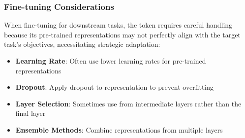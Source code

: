 \subsubsection{Fine-tuning Considerations}
When fine-tuning for downstream tasks, the \cls{} token requires careful handling because its pre-trained representations may not perfectly align with the target task's objectives, necessitating strategic adaptation:
\begin{comment}
Feedback: One more sentence to elaborate why we need some extra care for downstream tasks.

STATUS: addressed - added explanation about why CLS tokens need careful handling during fine-tuning
\end{comment}

\begin{itemize}
\item \textbf{Learning Rate}: Often use lower learning rates for pre-trained \cls{} representations
\item \textbf{Dropout}: Apply dropout to \cls{} representation to prevent overfitting
\item \textbf{Layer Selection}: Sometimes use \cls{} from intermediate layers rather than the final layer
\item \textbf{Ensemble Methods}: Combine \cls{} representations from multiple layers
\end{itemize}

